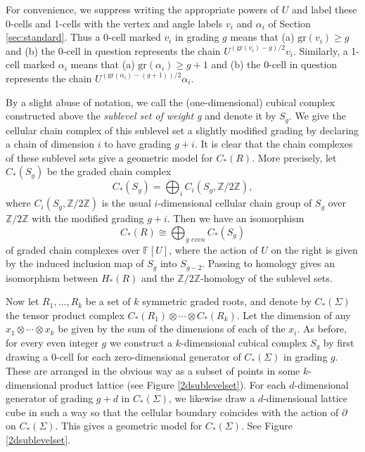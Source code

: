 \documentclass[11 pt]{amsart}
\theoremstyle{remark}
\def\gr{\mathrm{gr}}
\begin{document}
For convenience, we suppress writing the appropriate powers of $U$ and label these 0-cells and 1-cells with the vertex and angle labels $v_i$ and $\alpha_i$ of Section \ref{sec:standard}. Thus a 0-cell marked $v_i$ in grading $g$ means that (a) $\gr(v_i) \geq g$ and (b) the 0-cell in question represents the chain $U^{(\gr(v_i)-g)/2}v_i$. Similarly, a 1-cell marked $\alpha_i$ means that (a) $\gr(\alpha_i) \geq g + 1$ and (b) the 0-cell in question represents the chain $U^{(\gr(\alpha_i) - (g+1))/2}\alpha_i$. 


By a slight abuse of notation, we call the (one-dimensional) cubical complex constructed above the \textit{sublevel set of weight g} and denote it by $S_g$. We give the cellular chain complex of this sublevel set a slightly modified grading by declaring a chain of dimension $i$ to have grading $g+ i$. It is clear that the chain complexes of these sublevel sets give a geometric model for $C_*(R)$. More precisely, let $C_*(S_g)$ be the graded chain complex
\[
C_*(S_g) = \bigoplus_i C_i(S_g, \mathbb{Z}/2\mathbb{Z}),
\]
where $C_i(S_g, \mathbb{Z}/2\mathbb{Z})$ is the usual $i$-dimensional cellular chain group of $S_g$ over $\mathbb{Z}/2\mathbb{Z}$ with the modified grading $g + i$. Then we have an isomorphism 
\[
C_*(R) \cong \bigoplus_{g \textit{ even}} C_*(S_g)
\]
of graded chain complexes over $\mathbb{F}[U]$, where the action of $U$ on the right is given by the induced inclusion map of $S_g$ into $S_{g-2}$. Passing to homology gives an isomorphism between $H_*(R)$ and the $\mathbb{Z}/2\mathbb{Z}$-homology of the sublevel sets. 

Now let $R_1, \ldots, R_k$ be a set of $k$ symmetric graded roots, and denote by $C_*(\Sigma)$ the tensor product complex $C_*(R_1) \otimes \cdots \otimes C_*(R_k)$. Let the dimension of any $x_1 \otimes \cdots \otimes x_k$ be given by the sum of the dimensions of each of the $x_i$. As before, for every even integer $g$ we construct a $k$-dimensional cubical complex $S_g$ by first drawing a 0-cell for each zero-dimensional generator of $C_*(\Sigma)$ in grading $g$. These are arranged in the obvious way as a subset of points in some $k$-dimensional product lattice (see Figure \ref{2dsublevelset}). For each $d$-dimensional generator of grading $g + d$ in $C_*(\Sigma)$, we likewise draw a $d$-dimensional lattice cube in such a way so that the cellular boundary coincides with the action of $\partial$ on $C_*(\Sigma)$. This gives a geometric model for $C_*(\Sigma)$. See Figure \ref{2dsublevelset}. 
\end{document}
